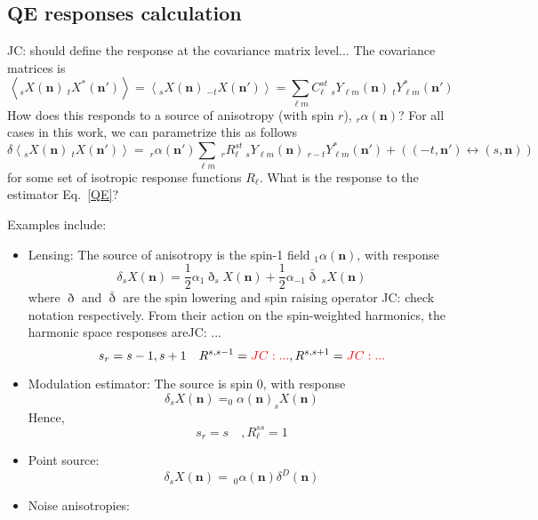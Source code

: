 \documentclass{article}
\newcommand{\Ylm}[1]{\:_{#1}Y_{\ell m}}
\newcommand{\Ylms}[1]{\:_{#1}Y^*_{\ell m}}
\newcommand{\av}[1]{\left\langle #1 \right\rangle}
\newcommand{\JC}[1]{\color{red}JC: #1\color{black}}
\newcommand{\hn}[0]{\boldsymbol{n}}
\begin{document}
 \subsection{QE responses calculation}
 \JC{should define the response at the covariance matrix level...}
 The covariance matrices is
 \begin{equation}
 	\av{_sX(\hn)\:_tX^*(\hn')} =\av{_sX(\hn)\:_{-t}X(\hn')} = \sum_{\ell m} C^{s t}_\ell \Ylm s(\hn) \Ylms {t}(\hn')
 \end{equation}
 How does this responds to a source of anisotropy (with spin $r$), $_r\alpha(\hn)$? For all cases in this work, we can parametrize this as follows
  \begin{equation}
 	\delta \av{_sX(\hn)\:_{t}X(\hn')} = \:_r\alpha(\hn')\sum_{\ell m}\: _rR^{st}_\ell \Ylm s(\hn) \Ylms {r - t}(\hn') + ( (-t, \hn') \leftrightarrow (s,\hn))
 \end{equation}
for some set of isotropic response functions $R_\ell$. What is the response to the estimator Eq.~\eqref{QE}?

Examples include:
\begin{itemize}
	\item Lensing: The source of anisotropy is the spin-1 field $_1\alpha(\hn)$, with response
	\begin{equation}
		\delta _sX(\hn) =  \frac 12 \alpha_1 \eth _{s}X(\hn) + \frac 12 \alpha_{-1} \bar \eth \:_sX(\hn) 
	\end{equation}
	where $\eth$ and $\bar \eth$ are the spin lowering and spin raising operator \JC{check notation } respectively. From their action on the spin-weighted harmonics, the harmonic space responses are\JC{...}
	\begin{equation}
		s_r = s-1, s+ 1 \quad R^{s,s-1} = \JC{...}, R^{s,s+1} = \JC{...}
	\end{equation}
	\item Modulation estimator: The source is spin 0, with response
	\begin{equation}
	\delta _sX(\hn) = _0\alpha(\hn) _{s}X(\hn)	
	\end{equation}
	Hence,
	\begin{equation}
		s_r = s\quad, R_\ell^{ss} = 1
	\end{equation}
	\item Point source:
	\begin{equation}
	\delta _sX(\hn) = \:_0\alpha(\hn) \delta^D(\hn)
	\end{equation}
	\item Noise anisotropies:
\end{itemize} 
\end{document}
